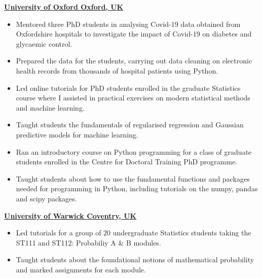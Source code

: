 \documentclass{my_cv}
\begin{document}
\uline{\large\bfseries{University of Oxford}  \hfill \large\bfseries{Oxford, UK}}
{\begin{addmargin}[2em]{0em}

    \begin{itemize}[topsep=0pt,itemsep=0pt,partopsep=0pt, parsep=0pt] 
    \item Mentored three PhD students in analysing Covid-19 data obtained from Oxfordshire hospitals to investigate the impact of Covid-19 on diabetes and glycaemic control.
    \item Prepared the data for the students, carrying out data cleaning on electronic health records from thousands of hospital patients using Python.
    \end{itemize}
    \begin{itemize}[topsep=0pt,itemsep=0pt,partopsep=0pt, parsep=0pt] 
    \item Led online tutorials for PhD students enrolled in the graduate Statistics course where I assisted in practical exercises on modern statistical methods and machine learning.
    \item Taught students the fundamentals of regularised regression and Gaussian predictive models for machine learning.
    \end{itemize}
    \begin{itemize}[topsep=0pt,itemsep=0pt,partopsep=0pt, parsep=0pt] 
    \item Ran an introductory course on Python programming for a class of graduate students enrolled in the Centre for Doctoral Training PhD programme.
    \item Taught students about how to use the fundamental functions and packages needed for programming in Python, including tutorials on the numpy, pandas and scipy packages.
    \end{itemize}
\end{addmargin}}
\vspace{0.2cm}
\uline{\large\bfseries{University of Warwick}  \hfill \large\bfseries{Coventry, UK}}
{\begin{addmargin}[2em]{0em}
    \begin{itemize}[topsep=0pt,itemsep=0pt,partopsep=0pt, parsep=0pt] 
    \item Led tutorials for a group of 20 undergraduate Statistics students taking the ST111 and ST112: Probabiliy A \& B modules.
    \item Taught students about the foundational notions of mathematical probability and marked assignments for each module.
     \end{itemize}
\end{addmargin}}
\end{document}
